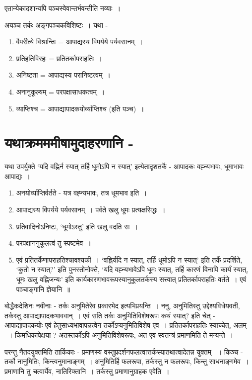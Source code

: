 {एतान्येकादशान्यपि पञ्चस्वेवान्तर्भवन्तीति नव्याः~। 

अयञ्च तर्कः अङ्गपञ्चकविशिष्टः~। यथा - 
\begin{enumerate}
\item	वैपरीत्ये विश्रान्तिः = आपाद्यस्य विपर्यये पर्यवसानम्~। 
\item	प्रतिहतिविरहः = प्रतितर्कापराहतिः~। 
\item	अनिष्टता  = आपाद्यस्य परानिष्टत्वम्~। 
\item	अनानुकूल्यम् = परपक्षासाधकत्वम्~। 
\item	व्याप्तिश्च = आपाद्यापादकयोर्व्याप्तिश्च (इति पञ्च)~। 
\end{enumerate}

\section*{यथाक्रमममीषामुदाहरणानि -} 

यथा उपर्युक्ते ‘यदि वह्निर्न स्यात् तर्हि धूमोऽपि न स्यात्' इत्येतादृशतर्के -  आपादकः वह्न्यभावः, धूमाभावः आपाद्यः~। 
\begin{enumerate}
\item	अनयोर्व्याप्तिर्वर्तते - यत्र वह्न्यभावः, तत्र धूमभाव इति~। 
\item	आपाद्यस्य विपर्यये पर्यवसानम्~। पर्वते खलु धूमः प्रत्यक्षसिद्धः~। 
\item	प्रतिवादिनोऽनिष्टः, ‘धूमोऽस्तु' इति खलु वदति सः~। 
\item	परपक्षाननुकूलत्वं तु स्पष्टमेव~। 
\item	एवं प्रतितर्केणापराहतिश्चावश्यकी~। ‘वह्निर्यदि न स्यात्, तर्हि धूमोऽपि न स्यात्' इति तर्के प्रदर्शिते, ‘कुतो न स्यात्?' इति पुनस्तोनोक्ते, ‘यदि वह्न्यभावेऽपि धूमः स्यात्, तर्हि कारणं विनापि कार्यं स्यात्, धूमः खलु वह्निजन्यः' इति कार्यकारणभावरूपस्यानुकूलतर्कस्य सत्त्वात् प्रतितर्कापराहतिः वर्तते~। एवं पञ्चाङ्गानि ज्ञेयानि~॥ 
\end{enumerate}
बोद्धैकदेशिनः नवीनाः  - तर्कः अनुमितेरेव प्रकारभेद इत्यभिप्रयन्ति~। ननु, अनुमितिस्तु उद्देश्यविधेयवती, तर्कस्तु आपाद्यापादकभाववान्~। एवं सति तर्कः अनुमितिविशेषरूपः कथं स्यात्? इति चेत् - आपाद्यापादकयोः एवं हेतुसाध्यभावापन्नत्वेन तर्कोऽप्यनुमितिविशेष एव~। प्रतितर्कापराहतिः स्याच्चेत्, अलम् ~। किमधिकापेक्षया ? अतस्तर्कोऽपि अनुमितिविशेषरूपः, अत एव स्वतन्त्रं प्रमाणमिति ते मन्यन्ते~। 

परन्तु नैतदयुक्तमिति तार्किकाः - प्रमाणस्य वस्तुप्रदर्शनफलत्वात्तर्कस्यातथात्वादेतन्न युक्तम् ~। किञ्च - तर्को नानुमितिः, किन्त्वनुमानाङ्गम्~। अनुमितिर्हि फलरूपा, तर्कस्तु न फलरूपः, किन्तु साधनाङ्गमेव~। प्रमाणानि तु चत्वार्येव, नातिरिक्तानि~। तर्कस्तु प्रमाणानुग्राहक एवेति~। 

}
